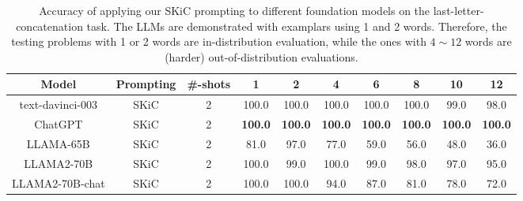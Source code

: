 \documentclass{article} %
\begin{document}
\begin{table}[ht]
 \caption{Accuracy of applying our SKiC prompting to different foundation models on the last-letter-concatenation task. The LLMs are demonstrated with examplars using 1 and 2 words. Therefore, the testing problems with 1 or 2 words are in-distribution evaluation, while the ones with $4\sim 12$ words are (harder) out-of-distribution evaluations. } \label{Tab:last_letter_results_llama2}
\centering
\small
\begin{tabular}{c|c|c|cc|ccccc} \toprule
\textbf{Model}                & \textbf{Prompting} &\textbf{\#-shots}     & \multicolumn{1}{c}{\textbf{1}} & \multicolumn{1}{c|}{\textbf{2}} & \multicolumn{1}{c}{\textbf{4}} & \multicolumn{1}{c}{\textbf{6}} & \multicolumn{1}{c}{\textbf{8}} & \multicolumn{1}{c}{\textbf{10}} & \multicolumn{1}{c}{\textbf{12}} \\ \midrule \midrule

text-davinci-003  
                           & SKiC  &2 & 100.0         & 100.0          & 100.0          & 100.0          & 100.0          & 99.0           & 98.0            \\  
ChatGPT   
                           & SKiC  &2 & \textbf{100.0}          & \textbf{100.0}          & \textbf{100.0}          & \textbf{100.0}          & \textbf{100.0}          & \textbf{100.0}           & \textbf{100.0}       \\ \midrule
LLAMA-65B
                           & SKiC  &2 & 81.0          & 97.0           & 77.0           & 59.0           & 56.0           & 48.0            & 36.0            \\ 
LLAMA2-70B & SKiC  &2 & 100.0         & 99.0          & 100.0          & 99.0          & 98.0          & 97.0           & 95.0            \\  
LLAMA2-70B-chat & SKiC  &2 & 100.0         & 100.0          & 94.0          & 87.0          & 81.0          & 78.0           & 72.0            \\   \bottomrule    
\end{tabular}
\end{table}
\end{document}
